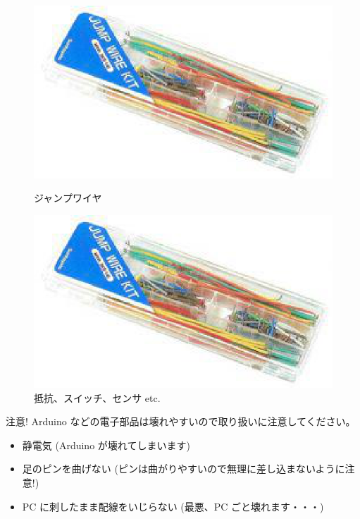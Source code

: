 \documentclass[11pt,a4paper]{jarticle}
\begin{document}
\begin{figure}[h!]
 \begin{minipage}{0.5\columnwidth}
  \centering
  \includegraphics[height=0.5\columnwidth]{img/jumpwire.eps}
  \caption{ジャンプワイヤ}
 \end{minipage}
 \begin{minipage}{0.5\columnwidth}
  \centering
  \includegraphics[height=0.5\columnwidth]{img/jumpwire.eps}
  \caption{抵抗、スイッチ、センサ etc.}
 \end{minipage}
\end{figure}


\begin{itembox}{注意!}
 Arduino などの電子部品は壊れやすいので取り扱いに注意してください。
 \begin{itemize}
  \item 静電気 (Arduino が壊れてしまいます)
  \item 足のピンを曲げない (ピンは曲がりやすいので無理に差し込まないように注意!)
  \item PC に刺したまま配線をいじらない (最悪、PC ごと壊れます・・・)
 \end{itemize}
\end{itembox}
\end{document}
